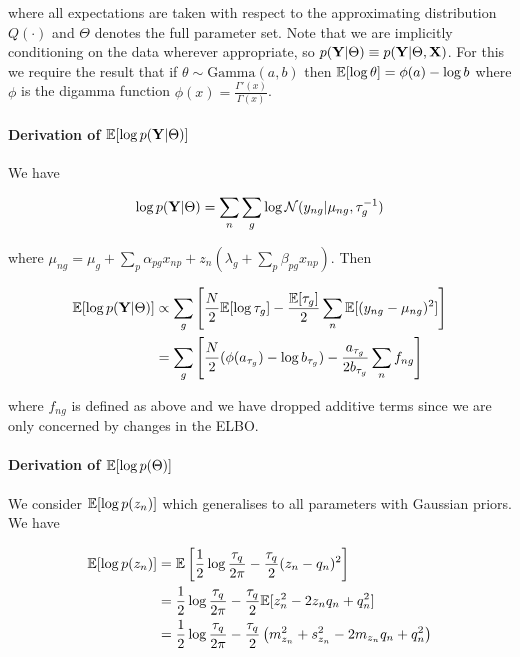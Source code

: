 where all expectations are taken with respect to the approximating distribution $Q(\cdot)$ and $\Theta$ denotes the full parameter set. Note that we are implicitly conditioning on the data wherever appropriate, so $p({\bf Y} | \Theta) \equiv p({\bf Y} | \Theta, {\bf X})$. For this we require the result that if $\theta \sim \text{Gamma}(a, b)$ then $\mathbb{E}[\log \theta] = \phi(a) - \log b$ where $\phi$ is the digamma function $\phi(x) = \frac{\Gamma'(x)}{\Gamma(x)}$.

\paragraph{Derivation of $\mathbb{E}[\log p({\bf Y} | \Theta)]$}

We have

\begin{equation}
\log p({\bf Y} | \Theta) = \sum_n \sum_g \log \mathcal{N}(y_{ng} | \mu_{ng}, \tau_g^{-1})
\end{equation}

where $\mu_{ng} = \mu_g + \sum_p \alpha_{pg} x_{np} + z_n \left( \lambda_g + \sum_p \beta_{pg} x_{np} \right)$. Then

\begin{equation}
\begin{aligned}
\mathbb{E}[ \log p({\bf Y} | \Theta) ] & \propto \sum_g \left[ \frac{N}{2} \mathbb{E}[\log \tau_g] -
\frac{\mathbb{E}[\tau_g]}{2} \sum_n \mathbb{E}[ (y_{ng} - \mu_{ng})^2 ] \right] \\
& = \sum_g \left[
\frac{N}{2} (\phi(a_{\tau_g}) - \log b_{\tau_g}) - \frac{a_{\tau_g}}{2 b_{\tau_g}} \sum_n f_{ng}
\right]
\end{aligned}
\end{equation}

where $f_{ng}$ is defined as above and we have dropped additive terms since we are only concerned by changes in the ELBO.

\paragraph{Derivation of  $\mathbb{E}[\log p(\Theta)]$}

We consider $\mathbb{E}[\log p (z_n)]$ which generalises to all parameters with Gaussian priors. We have

\begin{equation}
\begin{aligned}
\mathbb{E}[\log p (z_n)] &= \mathbb{E}\left[ \frac{1}{2} \log \frac{\tau_q}{2 \pi} - \frac{\tau_q}{2} (z_n - q_n)^2 \right] \\
& = \frac{1}{2} \log \frac{\tau_q}{2 \pi} - \frac{\tau_q}{2} \mathbb{E}[ z_n^2 - 2 z_n q_n + q_n^2 ] \\
& = \frac{1}{2} \log \frac{\tau_q}{2 \pi} - \frac{\tau_q}{2} \left( m_{z_n}^2 + s_{z_n}^2 - 2 m_{z_n} q_n + q_n^2 \right)
\end{aligned}
\end{equation}

